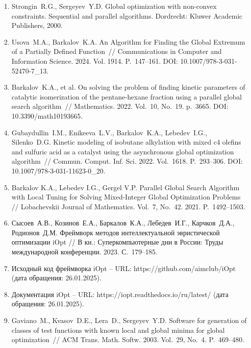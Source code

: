 \documentclass[a4paper,12pt,russian]{article}
\begin{document}
\begin{enumerate}
\item \label{rfa:rulit:Strongin2000}
Strongin~R.G., Sergeyev~Y.D. Global optimization with non-convex constraints. Sequential and parallel algorithms. Dordrecht: Kluwer Academic Publishers, 2000.


\item \label{rfa:rulit:Usova2024}
Usova~M.A., Barkalov~K.A. An Algorithm for Finding the Global Extremum of a Partially Defined Function~//
Communications in Computer and Information Science. 2024. Vol. 1914. P.~147--161. DOI: 10.1007/978-3-031-52470-7{\_}13.


\item \label{rfa:rulit:Barkalov2022}
Barkalov~K.A., et al. On solving the problem of finding kinetic parameters of catalytic isomerization of the pentane-hexane fraction using a parallel global search algorithm~// 
Mathematics. 2022. Vol.~10, No.~19. p.~3665. DOI: 10.3390/math10193665.

\item \label{rfa:rulit:Gubaydullin2022}
Gubaydullin~I.M., Enikeeva~L.V., Barkalov~K.A., Lebedev~I.G., Silenko~D.G. Kinetic modeling of isobutane alkylation with mixed c4 olefins and sulfuric acid as a catalyst using the asynchronous global optimization algorithm~//
Commun. Comput. Inf. Sci. 2022. Vol.~1618. P.~293--306. DOI: 10.1007/978-3-031-11623-0{\_}20.

\item \label{rfa:rulit:Barkalov2021}
Barkalov K.A., Lebedev I.G., Gergel V.P. Parallel Global Search Algorithm with Local Tuning for Solving Mixed-Integer Global Optimization Problems // Lobachevskii Journal of Mathematics. Vol.~7, No.~42. 2021. P.~1492--1503.

\item \label{rfa:rulit:iOptPaper}
Сысоев~А.В., Козинов~Е.А., Баркалов~К.А., Лебедев~И.Г., Карчков~Д.А., Родионов~Д.М. Фреймворк методов интеллектуальной эвристической оптимизации iOpt // В кн.: Суперкомпьютерные дни в России: Труды международной конференции. 2023. С.~179--185.

\item \label{rfa:rulit:iOptGithub}
Исходный код фреймворка iOpt -- URL: https://github.com/aimclub/iOpt (дата обращения: 26.01.2025).

\item \label{rfa:rulit:iOptDocs}
Документация iOpt -- URL: https://iopt.readthedocs.io/ru/latest/ (дата обращения: 26.01.2025).


\item \label{rfa:rulit:Gaviano2003}
Gaviano~M., Kvasov~D.E., Lera~D., Sergeyev~Y.D. Software for generation of classes of test functions with known local and global minima for global optimization~// ACM Trans. Math. Softw. 2003. Vol.~29, No.~4. P.~469--480.


\end{enumerate}
\end{document}

